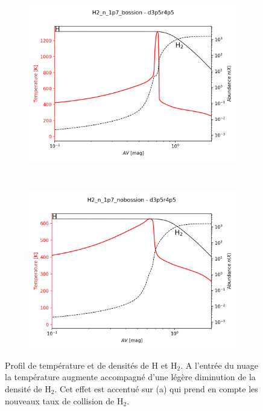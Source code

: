 \begin{figure}[!htbp]
    \centering
    \begin{subfigure}[t]{0.49\textwidth} %
        \centering \includegraphics[trim = {0 0 0 1cm},clip,width=1\textwidth]{figure/H2/rec_elec/H2_n_1p7_bossion_d3p5r4p5_H.png}
        \caption{}
    \end{subfigure}
    ~ 
    \begin{subfigure}[t]{0.49\textwidth} %
        \centering \includegraphics[trim = {0 0 0 1cm},clip,width=1\textwidth]{figure/H2/rec_elec/H2_n_1p7_nobossion_d3p5r4p5_H.png}
        \caption{}
    \end{subfigure}
    
    \caption{Profil de température et de densités de $\mathrm{H}$ et $\mathrm{H}_2$. A l'entrée du nuage la température augmente accompagné d'une légère diminution de la densité de $\mathrm{H}_2$. Cet effet est accentué sur (a) qui prend en compte les nouveaux taux de collision de $\mathrm{H}_2$. }
    \label{fig:H2:recomb:profilH}
\end{figure}
    
